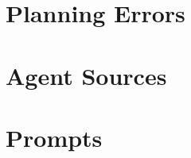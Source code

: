 \documentclass{article}
\theoremstyle{plain}
\theoremstyle{definition}
\theoremstyle{remark}
\begin{document}
% 


\section{Planning Errors}
\label{appendix:error}




\section{Agent Sources}
\label{appendix:source}




\section{Prompts}
\label{appendix:prompt}

\end{document}
